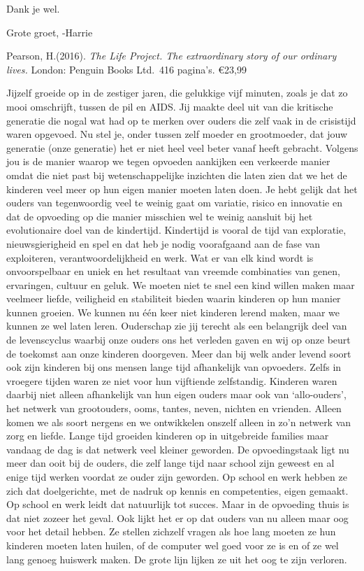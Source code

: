 \documentclass[]{book}
\begin{document}
Dank je wel.

Grote groet, -Harrie

Pearson, H.(2016). \emph{The Life Project. The extraordinary story of
our ordinary lives.} London: Penguin Books Ltd.~416 pagina's. €23,99

Jijzelf groeide op in de zestiger jaren, die gelukkige vijf minuten,
zoals je dat zo mooi omschrijft, tussen de pil en AIDS. Jij maakte deel
uit van die kritische generatie die nogal wat had op te merken over
ouders die zelf vaak in de crisistijd waren opgevoed. Nu stel je, onder
tussen zelf moeder en grootmoeder, dat jouw generatie (onze generatie)
het er niet heel veel beter vanaf heeft gebracht. Volgens jou is de
manier waarop we tegen opvoeden aankijken een verkeerde manier omdat die
niet past bij wetenschappelijke inzichten die laten zien dat we het de
kinderen veel meer op hun eigen manier moeten laten doen. Je hebt gelijk
dat het ouders van tegenwoordig veel te weinig gaat om variatie, risico
en innovatie en dat de opvoeding op die manier misschien wel te weinig
aansluit bij het evolutionaire doel van de kindertijd. Kindertijd is
vooral de tijd van exploratie, nieuwsgierigheid en spel en dat heb je
nodig voorafgaand aan de fase van exploiteren, verantwoordelijkheid en
werk. Wat er van elk kind wordt is onvoorspelbaar en uniek en het
resultaat van vreemde combinaties van genen, ervaringen, cultuur en
geluk. We moeten niet te snel een kind willen maken maar veelmeer
liefde, veiligheid en stabiliteit bieden waarin kinderen op hun manier
kunnen groeien. We kunnen nu één keer niet kinderen lerend maken, maar
we kunnen ze wel laten leren. Ouderschap zie jij terecht als een
belangrijk deel van de levenscyclus waarbij onze ouders ons het verleden
gaven en wij op onze beurt de toekomst aan onze kinderen doorgeven. Meer
dan bij welk ander levend soort ook zijn kinderen bij ons mensen lange
tijd afhankelijk van opvoeders. Zelfs in vroegere tijden waren ze niet
voor hun vijftiende zelfstandig. Kinderen waren daarbij niet alleen
afhankelijk van hun eigen ouders maar ook van `allo-ouders', het netwerk
van grootouders, ooms, tantes, neven, nichten en vrienden. Alleen komen
we als soort nergens en we ontwikkelen onszelf alleen in zo'n netwerk
van zorg en liefde. Lange tijd groeiden kinderen op in uitgebreide
families maar vandaag de dag is dat netwerk veel kleiner geworden. De
opvoedingstaak ligt nu meer dan ooit bij de ouders, die zelf lange tijd
naar school zijn geweest en al enige tijd werken voordat ze ouder zijn
geworden. Op school en werk hebben ze zich dat doelgerichte, met de
nadruk op kennis en competenties, eigen gemaakt. Op school en werk leidt
dat natuurlijk tot succes. Maar in de opvoeding thuis is dat niet zozeer
het geval. Ook lijkt het er op dat ouders van nu alleen maar oog voor
het detail hebben. Ze stellen zichzelf vragen als hoe lang moeten ze hun
kinderen moeten laten huilen, of de computer wel goed voor ze is en of
ze wel lang genoeg huiswerk maken. De grote lijn lijken ze uit het oog
te zijn verloren.
\end{document}
